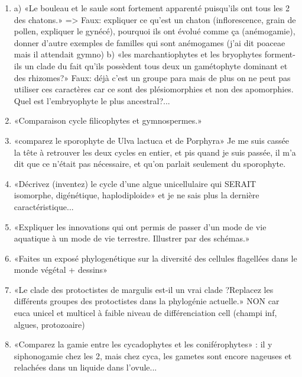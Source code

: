 \begin{enumerate}
	\item a) «Le bouleau et le saule sont fortement apparenté puisqu'ils ont tous les 2 des chatons.» =>  Faux: expliquer ce qu'est un chaton (inflorescence, grain de pollen, expliquer le gynécé), pourquoi ils ont évolué comme ça (anémogamie), donner d'autre exemples de familles qui sont anémogames (j'ai dit poaceae mais il attendait gymno)
b) «les marchantiophytes et les bryophytes forment-ils un clade du fait qu'ils possèdent tous deux un gamétophyte dominant et des rhizomes?» Faux: déjà c'est un groupe para mais de plus on ne peut pas utiliser ces caractères car ce sont des plésiomorphies et non des apomorphies. Quel est l'embryophyte le plus ancestral?...

	\item «Comparaison cycle filicophytes et gymnospermes.»

	\item «comparez le sporophyte de Ulva lactuca et de Porphyra» 
Je me suis cassée la tête à retrouver les deux cycles en entier, et pis quand je suis passée, il m’a dit que ce n'était pas nécessaire, et qu'on parlait seulement du sporophyte.

	\item «Décrivez (inventez) le cycle d'une algue unicellulaire qui SERAIT  isomorphe,
digénétique, haplodiploide» et je ne sais plus la dernière caractéristique...

	\item «Expliquer les innovations qui ont permis de passer d'un mode de vie aquatique à un mode de vie terrestre. Illustrer par des schémas.»

	\item «Faites un exposé phylogenétique sur la diversité des cellules flagellées dans le monde végétal + dessins»

	\item «Le clade des protoctistes de margulis est-il un vrai clade ?Replacez les différents groupes des protoctistes dans la phylogénie actuelle.» NON car euca unicel et multicel à faible niveau de différenciation cell (champi inf, algues, protozoaire)

	\item «Comparez la gamie entre les cycadophytes et les coniférophytes» : il y siphonogamie chez les 2, mais chez cyca, les gametes sont encore nageuses et relachées dans un liquide dans l'ovule...


\end{enumerate}
